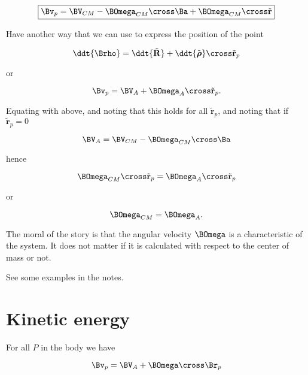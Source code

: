 \begin{equation}\label{eqn:rigidBodyMotion:240}
\boxed{
\Bv_p = \BV_{CM} - 
\BOmega_{CM} \cross \Ba
+\BOmega_{CM} \cross \tilde{\mathbf{r}}
}
\end{equation}

Have another way that we can use to express the position of the point 

\begin{equation}\label{eqn:rigidBodyMotion:260}
\ddt{\Brho} 
= \ddt{\tilde{\mathbf{R}}} + \ddt{\tilde{\boldsymbol{\rho}}} \cross \tilde{\mathbf{r}}_p 
\end{equation}

or

\begin{equation}\label{eqn:rigidBodyMotion:280}
\Bv_p = \BV_A + \BOmega_A \cross \tilde{\mathbf{r}}_p.
\end{equation}

Equating with above, and noting that this holds for all $\tilde{\mathbf{r}}_p$, and noting that if $\tilde{\mathbf{r}}_p = 0$

\begin{equation}\label{eqn:rigidBodyMotion:300}
\BV_A = \BV_{CM} - \BOmega_{CM} \cross \Ba
\end{equation}

hence

\begin{equation}\label{eqn:rigidBodyMotion:320}
\BOmega_{CM} \cross \tilde{\mathbf{r}}_p = \BOmega_A \cross \tilde{\mathbf{r}}_p
\end{equation}

or

\begin{equation}\label{eqn:rigidBodyMotion:340}
\BOmega_{CM} = \BOmega_A.
\end{equation}

The moral of the story is that the angular velocity $\BOmega$ is a characteristic of the system.  It does not matter if it is calculated with respect to the center of mass or not.

See some examples in the notes.

\section{Kinetic energy}

For all $P$ in the body we have

\begin{equation}\label{eqn:rigidBodyMotion:360}
\Bv_p = \BV_A + \BOmega \cross \Br_p
\end{equation}

